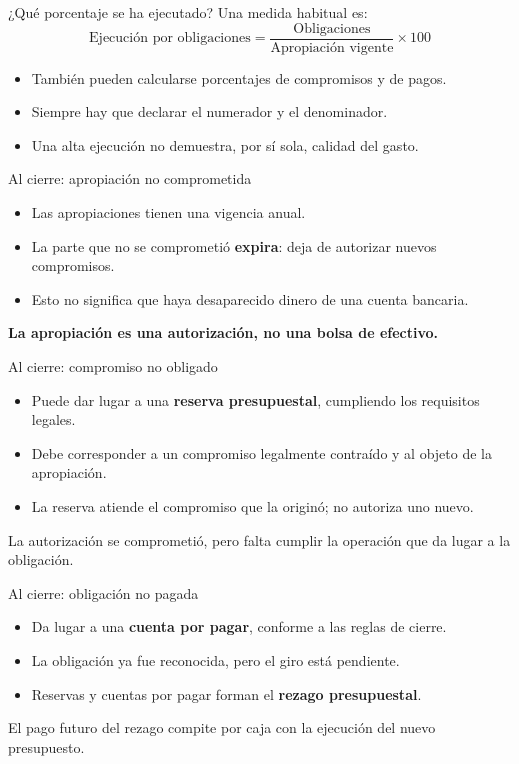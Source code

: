 \begin{frame}{¿Qué porcentaje se ha ejecutado?}
Una medida habitual es:
\[\text{Ejecución por obligaciones}=\frac{\text{Obligaciones}}{\text{Apropiación vigente}}\times100\]
\begin{itemize}
  \item También pueden calcularse porcentajes de compromisos y de pagos.
  \item Siempre hay que declarar el numerador y el denominador.
  \item Una alta ejecución no demuestra, por sí sola, calidad del gasto.
\end{itemize}
\end{frame}

\begin{frame}{Al cierre: apropiación no comprometida}
\begin{itemize}
  \item Las apropiaciones tienen una vigencia anual.
  \item La parte que no se comprometió \textbf{expira}: deja de autorizar nuevos compromisos.
  \item Esto no significa que haya desaparecido dinero de una cuenta bancaria.
\end{itemize}
\vspace{0.7em}
\textbf{La apropiación es una autorización, no una bolsa de efectivo.}
\end{frame}

\begin{frame}{Al cierre: compromiso no obligado}
\begin{itemize}
  \item Puede dar lugar a una \textbf{reserva presupuestal}, cumpliendo los requisitos legales.
  \item Debe corresponder a un compromiso legalmente contraído y al objeto de la apropiación.
  \item La reserva atiende el compromiso que la originó; no autoriza uno nuevo.
\end{itemize}
\vspace{0.7em}
La autorización se comprometió, pero falta cumplir la operación que da lugar a la obligación.
\end{frame}

\begin{frame}{Al cierre: obligación no pagada}
\begin{itemize}
  \item Da lugar a una \textbf{cuenta por pagar}, conforme a las reglas de cierre.
  \item La obligación ya fue reconocida, pero el giro está pendiente.
  \item Reservas y cuentas por pagar forman el \textbf{rezago presupuestal}.
\end{itemize}
\vspace{0.7em}
El pago futuro del rezago compite por caja con la ejecución del nuevo presupuesto.
\end{frame}

